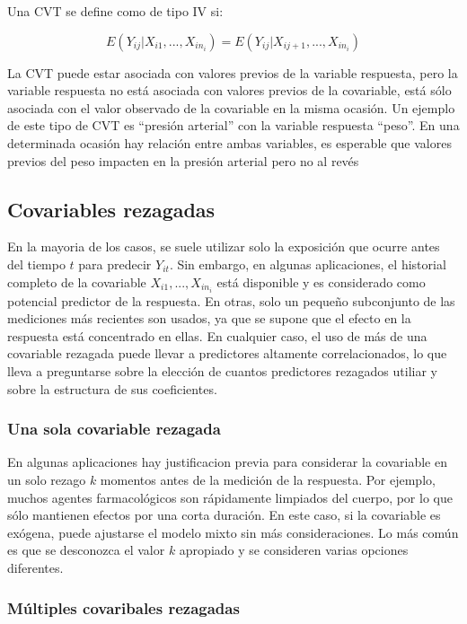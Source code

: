 \documentclass[spanish]{article}
\numberwithin{figure}{subsection}
\numberwithin{equation}{subsection}
\numberwithin{table}{subsection}
\def\xseqn{$X_{i1}, ..., X_{in_i}$}
\begin{document}
Una CVT se define como de tipo IV si:

\begin{equation}
	\label{CVT tipo IV}
	E(Y_{ij}|X_{i1}, ..., X_{in_i}) = E(Y_{ij}|X_{ij+1}, ..., X_{in_i})
\end{equation}

La CVT puede estar asociada con valores previos de la variable respuesta, pero
la variable respuesta no está asociada con valores previos de la covariable,
está sólo asociada con el valor observado de la covariable en la misma ocasión.
Un ejemplo de este tipo de CVT es ``presión arterial'' con la variable
respuesta ``peso''. En una determinada ocasión hay relación entre ambas
variables, es esperable que valores previos del peso impacten en la presión
arterial pero no al revés

\subsection{Covariables rezagadas}

En la mayoria de los casos, se suele utilizar solo la exposición que ocurre
antes del tiempo $t$ para predecir $Y_{it}$. Sin embargo, en algunas
aplicaciones, el historial completo de la covariable \xseqn{} está disponible y
es considerado como potencial predictor de la respuesta. En otras, solo un
pequeño subconjunto de las mediciones más recientes son usados, ya que se
supone que el efecto en la respuesta está concentrado en ellas. En cualquier
caso, el uso de más de una covariable rezagada puede llevar a predictores
altamente correlacionados, lo que lleva a preguntarse sobre la elección de
cuantos predictores rezagados utiliar y sobre la estructura de sus
coeficientes.

\subsubsection{Una sola covariable rezagada}

En algunas aplicaciones hay justificacion previa para considerar la covariable
en un solo rezago $k$ momentos antes de la medición de la respuesta. Por
ejemplo, muchos agentes farmacológicos son rápidamente limpiados del cuerpo,
por lo que sólo mantienen efectos por una corta duración. En este caso, si la
covariable es exógena, puede ajustarse el modelo mixto sin más consideraciones.
Lo más común es que se desconozca el valor $k$ apropiado y se consideren varias
opciones diferentes.

\subsubsection{Múltiples covaribales rezagadas}
\end{document}
